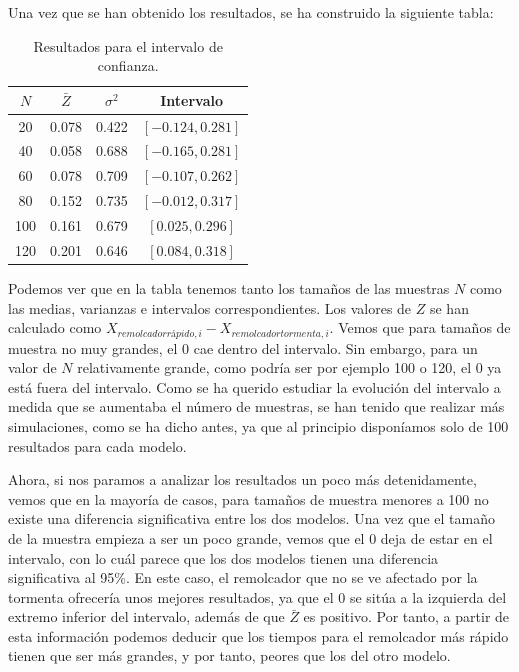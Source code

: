 \documentclass[11pt,a4paper]{article}
\begin{document}
Una vez que se han obtenido los resultados, se ha construido la siguiente
tabla:

\begin{table}[H]
\centering
\begin{tabular}{|c|c|c|c|}
\hline
\textbf{$N$} & \textbf{$\bar{Z}$} & \textbf{$\sigma^2$} & \textbf{Intervalo} \\ \hline
20 & 0.078 & 0.422 & $[-0.124, 0.281]$ \\ \hline
40 & 0.058 & 0.688 & $[-0.165,  0.281]$ \\ \hline
60 & 0.078 & 0.709 & $[-0.107, 0.262]$ \\ \hline
80 & 0.152 & 0.735 & $[-0.012, 0.317]$ \\ \hline
100 & 0.161 & 0.679 & $[0.025, 0.296]$ \\ \hline
120 & 0.201 & 0.646 & $[0.084, 0.318]$ \\ \hline
\end{tabular}
\caption{Resultados para el intervalo de confianza.}
\label{tab:confianza}
\end{table}

Podemos ver que en la tabla tenemos tanto los tamaños de las muestras $N$
como las medias, varianzas e intervalos correspondientes. Los valores
de $Z$ se han calculado como $X_{remolcador rápido, i} - X_{remolcador tormenta, i}$.
Vemos que para tamaños de muestra no muy grandes, el 0 cae dentro del intervalo. Sin embargo,
para un valor de $N$ relativamente grande, como podría ser por ejemplo 100 o 120, el 0
ya está fuera del intervalo. Como se ha querido estudiar la evolución del intervalo
a medida que se aumentaba el número de muestras, se han tenido que realizar más
simulaciones, como se ha dicho antes, ya que al principio disponíamos solo de
100 resultados para cada modelo.

Ahora, si nos paramos a analizar los resultados un poco más detenidamente,
vemos que en la mayoría de casos, para tamaños de muestra menores
a 100 no existe una diferencia significativa entre los dos modelos. Una
vez que el tamaño de la muestra empieza a ser un poco grande, vemos que
el 0 deja de estar en el intervalo, con lo cuál parece que los dos modelos
tienen una diferencia significativa al 95\%. En este caso, el remolcador
que no se ve afectado por la tormenta ofrecería unos mejores resultados,
ya que el 0 se sitúa a la izquierda del extremo inferior del intervalo, además
de que $\bar{Z}$ es positivo. Por tanto, a partir de esta información podemos
deducir que los tiempos para el remolcador más rápido tienen que ser más grandes,
y por tanto, peores que los del otro modelo.
\end{document}
